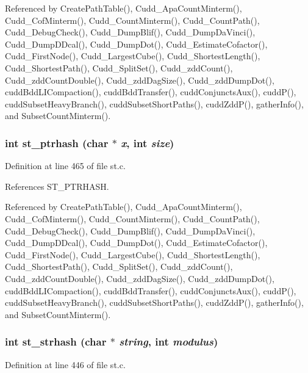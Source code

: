 Referenced by Create\-Path\-Table(), Cudd\_\-Apa\-Count\-Minterm(), Cudd\_\-Cof\-Minterm(), Cudd\_\-Count\-Minterm(), Cudd\_\-Count\-Path(), Cudd\_\-Debug\-Check(), Cudd\_\-Dump\-Blif(), Cudd\_\-Dump\-Da\-Vinci(), Cudd\_\-Dump\-DDcal(), Cudd\_\-Dump\-Dot(), Cudd\_\-Estimate\-Cofactor(), Cudd\_\-First\-Node(), Cudd\_\-Largest\-Cube(), Cudd\_\-Shortest\-Length(), Cudd\_\-Shortest\-Path(), Cudd\_\-Split\-Set(), Cudd\_\-zdd\-Count(), Cudd\_\-zdd\-Count\-Double(), Cudd\_\-zdd\-Dag\-Size(), Cudd\_\-zdd\-Dump\-Dot(), cudd\-Bdd\-LICompaction(), cudd\-Bdd\-Transfer(), cudd\-Conjuncts\-Aux(), cudd\-P(), cudd\-Subset\-Heavy\-Branch(), cudd\-Subset\-Short\-Paths(), cudd\-Zdd\-P(), gather\-Info(), and Subset\-Count\-Minterm().
\subsubsection{\setlength{\rightskip}{0pt plus 5cm}int st\_\-ptrhash (char $\ast$ {\em x}, int {\em size})}\label{st_8c_da6e90b4df1ca291977c89a6d4fdea06}




Definition at line 465 of file st.c.

References ST\_\-PTRHASH.

Referenced by Create\-Path\-Table(), Cudd\_\-Apa\-Count\-Minterm(), Cudd\_\-Cof\-Minterm(), Cudd\_\-Count\-Minterm(), Cudd\_\-Count\-Path(), Cudd\_\-Debug\-Check(), Cudd\_\-Dump\-Blif(), Cudd\_\-Dump\-Da\-Vinci(), Cudd\_\-Dump\-DDcal(), Cudd\_\-Dump\-Dot(), Cudd\_\-Estimate\-Cofactor(), Cudd\_\-First\-Node(), Cudd\_\-Largest\-Cube(), Cudd\_\-Shortest\-Length(), Cudd\_\-Shortest\-Path(), Cudd\_\-Split\-Set(), Cudd\_\-zdd\-Count(), Cudd\_\-zdd\-Count\-Double(), Cudd\_\-zdd\-Dag\-Size(), Cudd\_\-zdd\-Dump\-Dot(), cudd\-Bdd\-LICompaction(), cudd\-Bdd\-Transfer(), cudd\-Conjuncts\-Aux(), cudd\-P(), cudd\-Subset\-Heavy\-Branch(), cudd\-Subset\-Short\-Paths(), cudd\-Zdd\-P(), gather\-Info(), and Subset\-Count\-Minterm().
\subsubsection{\setlength{\rightskip}{0pt plus 5cm}int st\_\-strhash (char $\ast$ {\em string}, int {\em modulus})}\label{st_8c_19f7c89b3e6ea56f9a3c29c07271e29a}




Definition at line 446 of file st.c.